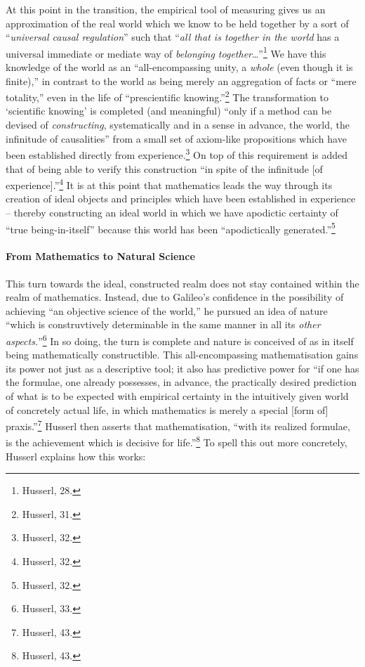 \documentclass[12pt]{article}
\begin{document}
	At this point in the transition, the empirical tool of measuring gives us an approximation of the real world which we know to be held together by a sort of ``\emph{universal causal regulation}'' such that ``\emph{all that is together in the world} has a universal immediate or mediate way of \emph{belonging together}\ldots''\footnote{Husserl, 28.} We have this knowledge of the world as an ``all-encompassing unity, a \emph{whole} (even though it is finite),'' in contrast to the world as being merely an aggregation of facts or ``mere totality,'' even in the life of ``prescientific knowing.''\footnote{Husserl, 31.} The transformation to `scientific knowing' is completed (and meaningful) ``only if a method can be devised of \emph{constructing}, systematically and in a sense in advance, the world, the infinitude of causalities'' from a small set of axiom-like propositions which have been established directly from experience.\footnote{Husserl, 32.} On top of this requirement is added that of being able to verify this construction ``in spite of the infinitude [of experience].''\footnote{Husserl, 32.} It is at this point that mathematics leads the way through its creation of ideal objects and principles which have been established in experience -- thereby constructing an ideal world in which we have apodictic certainty of ``true being-in-itself'' because this world has been ``apodictically generated.''\footnote{Husserl, 32.} 

	\paragraph*{From Mathematics to Natural Science} This turn towards the ideal, constructed realm does not stay contained within the realm of mathematics. Instead, due to Galileo's confidence in the possibility of achieving ``an objective science of the world,'' he pursued an idea of nature ``which is construvtively determinable in the same manner in all its \emph{other aspects.}''\footnote{Husserl, 33.} In so doing, the turn is complete and nature is conceived of as in itself being mathematically constructible. This all-encompassing mathematisation gains its power not just as a descriptive tool; it also has predictive power for ``if one has the formulae, one already possesses, in advance, the practically desired prediction of what is to be expected with empirical certainty in the intuitively given world of concretely actual life, in which mathematics is merely a special [form of] praxis.''\footnote{Husserl, 43.} Husserl then asserts that mathematisation, ``with its realized formulae, is the achievement which is decisive for life.''\footnote{Husserl, 43.} To spell this out more concretely, Husserl explains how this works:
	
\end{document}
